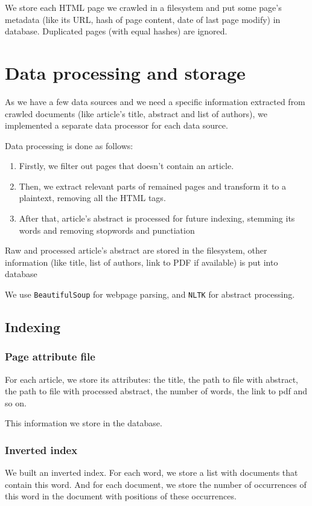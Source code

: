 We store each HTML page we crawled in a filesystem and put some page's metadata 
(like its URL, hash of page content, date of last page modify) in database. Duplicated pages (with equal hashes) are ignored.

\section{Data processing and storage}

As we have a few data sources and we need a specific information extracted from crawled documents
(like article's title, abstract and list of authors), we implemented a separate data processor for each data source.

Data processing is done as follows:
\begin{enumerate}

\item Firstly, we filter out pages that doesn't contain an article.

\item Then, we extract relevant parts of remained pages and transform it to a plaintext, removing all the HTML tags.

\item After that, article's abstract is processed for future indexing, stemming its words and removing stopwords and punctiation

\end{enumerate}

Raw and processed article's abstract are stored in the filesystem,
other information (like title, list of authors, link to PDF if available) is put into database

We use \texttt{BeautifulSoup} for webpage parsing, and \texttt{NLTK} for abstract processing.

\subsection{Indexing}
\subsubsection{Page attribute file}
For each article, we store its attributes: the title, the path to file with abstract, the path to file with processed abstract, the number of words, the link to pdf and so on.

This information we store in the database.

\subsubsection{Inverted index}
We built an inverted index. For each word, we store a list with documents that contain this word. And for each document, we store the number of occurrences of this word in the document with positions of these occurrences.

